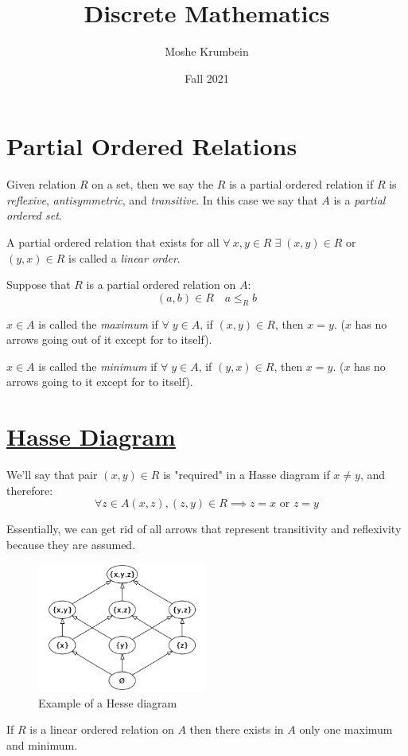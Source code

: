 \documentclass[00_complete]{subfiles}
\title{Discrete Mathematics}
\author{Moshe Krumbein}
\date{Fall 2021}
\begin{document}

\section{Partial Ordered Relations}

Given relation \(R\) on a set, then we say the \(R\) is a partial ordered
relation if \(R\) is \emph{reflexive}, \emph{antisymmetric}, and
\emph{transitive}. In this case we say that \(A\) is a \emph{partial ordered
set}.

\begin{definition}
A partial ordered relation that exists for all
\(\forall \: x,y \in R \;\exists\; (x,y) \in R\) or \((y,x) \in R\) is
called a \emph{linear order}.
\end{definition}

Suppose that \(R\) is a partial ordered relation on \(A\):
\[(a,b) \in R \quad a \leq_R b\]

\(x \in A\) is called the \emph{maximum} if \(\forall \; y \in A\), if
\((x,y) \in R\), then \(x=y\). (\(x\) has no arrows going out of it
except for to itself).

\(x \in A\) is called the \emph{minimum} if \(\forall \; y \in A\), if
\((y,x) \in R\), then \(x=y\). (\(x\) has no arrows going to it except
for to itself).

\section{\href{https://en.wikipedia.org/wiki/Hasse_diagram}{Hasse
Diagram}}

We'll say that pair \((x,y) \in R\) is "required" in a Hasse diagram
if \(x \neq y\), and therefore:
\[\forall z \in A (x,z),(z,y) \in R \implies z=x \text{ or } z=y\]

Essentially, we can get rid of all arrows that represent transitivity and
reflexivity because they are assumed.

\begin{figure}[ht!]
    \centering
    \includegraphics[width=0.5\textwidth]{w4-hesse}
    \caption{Example of a Hesse diagram}
\end{figure}

\begin{claim}
If \(R\) is a linear ordered relation on \(A\) then there exists in
\(A\) only one maximum and minimum.
\end{claim}
\end{document}
